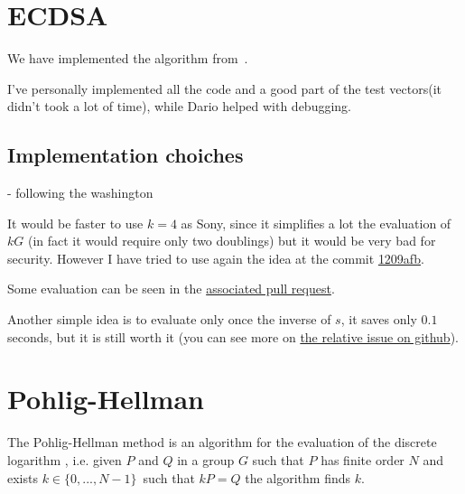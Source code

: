 \documentclass{article}
\theoremstyle{plain}
\theoremstyle{remark}
\theoremstyle{definition}
\begin{document}
\section{ECDSA}

We have implemented the algorithm from~\cite[Section 6.6]{washington}.

I've personally implemented all the code and a good part of the test vectors(it didn't took a lot of time), while Dario helped with debugging.

\subsection{Implementation choiches}

- following the washington

It would be faster to use $k = 4$ as Sony, since it simplifies a lot the evaluation of $kG$ (in fact it would require only two doublings) but it would be very bad for security. However I have tried to use again the idea at the commit \href{https://github.com/giacomoborin/project2_MAGMA/commit/1209afbbb3bed86d26ebf342bf6f43453de3e795}{1209afb}.

Some evaluation can be seen in the \href{https://github.com/giacomoborin/project2_MAGMA/pull/36}{associated pull request}.



Another simple idea is to evaluate only once the inverse of $s$, it saves only $0.1$ seconds, but it is still worth it (you can see more on \href{https://github.com/giacomoborin/project2_MAGMA/issues/13}{the relative issue on github}).

\section{Pohlig-Hellman}

The Pohlig-Hellman method is an algorithm for the evaluation of the discrete logarithm %
, i.e. given $P$ and $Q$ in a group $G$ such that $P$ has finite order $N$ and exists $k\in \{0,...,N-1\}$ such that $kP = Q$ the algorithm finds $k$. 
\end{document}
